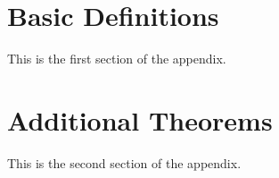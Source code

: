 \documentclass[12pt,a4paper,bold]{thesis}
\theoremstyle{thm}
\theoremstyle{definition}
\begin{document}
\begin{appendices}
\renewcommand{\thesection}{\Roman{section}}
\section{Basic Definitions}

This is the first section of the appendix.

\section{Additional Theorems}

This is the second section of the appendix.

\end{appendices}


\end{document}
